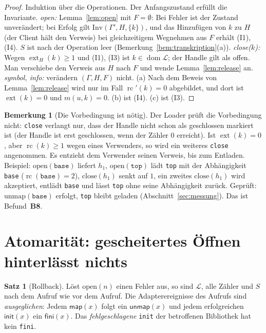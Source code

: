 \documentclass[a4paper,12pt,twoside]{report}
\DeclareRobustCommand{\_}{\ifmmode\mbox{\textunderscore}\else\textunderscore\allowbreak{}\fi}
\theoremstyle{definition}
\newtheorem{satz}{Satz}[chapter]
\newtheorem{bemerkung}{Bemerkung}[chapter]
\newcommand{\Bf}[1]{\textbf{B#1}}
\newcommand{\dom}{\operatorname{dom}}
\newcommand{\ext}{\operatorname{ext}}
\newcommand{\rc}{\operatorname{rc}}
\begin{document}
\begin{proof}
	Induktion über die Operationen. Der Anfangszustand erfüllt die Invariante. \emph{open:} Lemma~\ref{lem:open} mit $F=\emptyset$: Bei Fehler ist der Zustand unverändert; bei Erfolg gilt $\mathrm{Inv}(\Gamma',H,\{k\})$, und das Hinzufügen von $k$ zu $H$ (der Client hält den Verweis) bei gleichzeitigem Wegnehmen aus $F$ erhält (I1), (I4). $S$ ist nach der Operation leer (Bemerkung~\ref{bem:transkription}(a)). \emph{close($k$):} Wegen $\ext_H(k)\ge1$ und (I1), (I3) ist $k\in\dom\mathcal L$; der Handle gilt als offen. Man verschiebe den Verweis aus $H$ nach $F$ und wende Lemma~\ref{lem:release} an. \emph{symbol, info:} verändern $(\Gamma,H,F)$ nicht. (a) Nach dem Beweis von Lemma~\ref{lem:release} wird nur im Fall $\rc'(k)=0$ abgebildet, und dort ist $\ext(k)=0$ und $m(u,k)=0$. (b) ist (I4). (c) ist (I3).
\end{proof}

\begin{bemerkung}[Die Vorbedingung ist nötig]
	\label{bem:doppelt}
	Der Loader prüft die Vorbedingung nicht: \texttt{close} verlangt nur, dass der Handle nicht schon als geschlossen markiert ist (der Handle ist erst geschlossen, wenn der Zähler $0$ erreicht). Ist $\ext(k)=0$, aber $\rc(k)\ge1$ wegen eines Verwenders, so wird ein weiteres \texttt{close} angenommen. Es entzieht dem Verwender seinen Verweis, bis zum Entladen. Beispiel: $\mathrm{open}(\texttt{base})$ liefert $h_1$, $\mathrm{open}(\texttt{top})$ lädt \texttt{top} mit der Abhängigkeit \texttt{base} ($\rc(\texttt{base})=2$), $\mathrm{close}(h_1)$ senkt auf $1$, ein zweites $\mathrm{close}(h_1)$ wird akzeptiert, entlädt \texttt{base} und lässt \texttt{top} ohne seine Abhängigkeit zurück. Geprüft: $\mathrm{unmap}(\texttt{base})$ erfolgt, \texttt{top} bleibt geladen (Abschnitt~\ref{sec:messung}). Das ist Befund~\Bf{8}.
\end{bemerkung}

\section{Atomarität: gescheitertes Öffnen hinterlässt nichts}
\label{sec:rollback}

\begin{satz}[Rollback]
	\label{satz:rollback}
	Löst $\mathrm{open}(n)$ einen Fehler aus, so sind $\mathcal L$, alle Zähler und $S$ nach dem Aufruf wie vor dem Aufruf. Die Adapterereignisse des Aufrufs sind \emph{ausgeglichen}: Jedem $\mathsf{map}(x)$ folgt ein $\mathsf{unmap}(x)$ und jedem erfolgreichen $\mathsf{init}(x)$ ein $\mathsf{fini}(x)$. Das \emph{fehlgeschlagene} \texttt{init} der betroffenen Bibliothek hat kein \texttt{fini}.
\end{satz}
\end{document}
